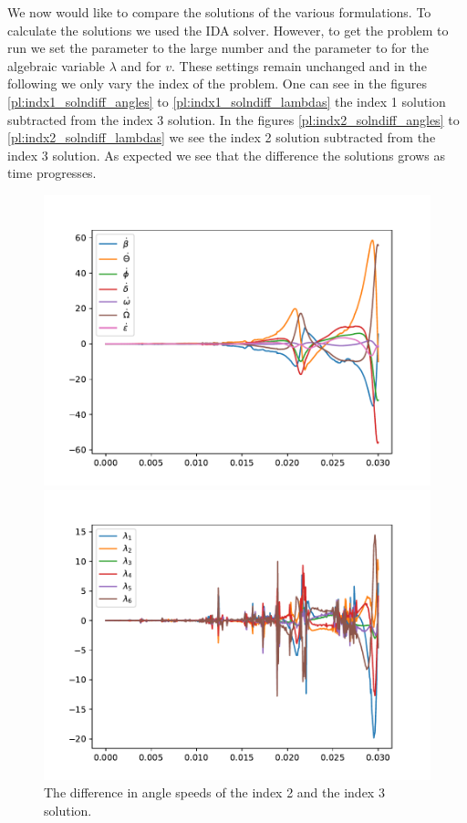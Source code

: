 \documentclass{report}
\begin{document}
We now would like to compare the solutions of the various formulations. To calculate the solutions we used the IDA solver. However, to get the problem to run we set the  parameter to the large number  and the  parameter to  for the algebraic variable $\lambda$ and for $v$. These settings remain unchanged and in the following we only vary the index of the problem. One can see in the figures \ref{pl:indx1_solndiff_angles} to \ref{pl:indx1_solndiff_lambdas}  the index 1 solution subtracted from the index 3 solution. In the figures \ref{pl:indx2_solndiff_angles} to \ref{pl:indx2_solndiff_lambdas} we see the index 2 solution subtracted from the index 3 solution. As expected we see that the difference the solutions grows as time progresses.


\begin{figure}[h]
\centering
\begin{minipage}[t]{0.45\textwidth}
\centering
\includegraphics[width=\textwidth]{../Plots/Project2_main/Figure_541}
\caption{The difference in angle speeds of the index 2 and the index 3 solution.}
\label{pl:indx2_solndiff_anglesdot}
\end{minipage}
\hfill
\begin{minipage}[t]{0.45\textwidth}
\centering
\includegraphics[width=\textwidth]{../Plots/Project2_main/Figure_542}

\end{minipage}
\end{figure}
\end{document}
